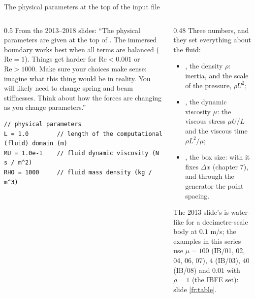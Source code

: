 \documentclass[aspectratio=169,11pt]{beamer}
\begin{document}
\begin{frame}[fragile]{The physical parameters at the top of the input file}
\label{fr:top}
\begin{columns}[T,onlytextwidth]
\begin{column}{0.5\textwidth}
\small From the 2013--2018 slides: ``The physical parameters are given at the top of . The immersed boundary works best when all terms are balanced ($\mathrm{Re} = 1$). Things get harder for $\mathrm{Re} < 0.001$ or $\mathrm{Re} > 1000$. Make sure your choices make sense: imagine what this thing would be in reality. You will likely need to change spring and beam stiffnesses. Think about how the forces are changing as you change parameters.''
\begin{lstlisting}[style=input]
// physical parameters
L = 1.0        // length of the computational (fluid) domain (m)
MU = 1.0e-1    // fluid dynamic viscosity (N s / m^2)
RHO = 1000     // fluid mass density (kg / m^3)
\end{lstlisting}
\end{column}
\begin{column}{0.48\textwidth}
\small Three numbers, and they set everything about the fluid:
\begin{itemize}
  \item {}, the density $\rho$: inertia, and the scale of the pressure, $\rho U^2$;
  \item {}, the dynamic viscosity $\mu$: the viscous stress $\mu U/L$ and the viscous time $\rho L^2/\mu$;
  \item {}, the box size: with  it fixes $\Delta x$ (chapter 7), and through the generator the point spacing.
\end{itemize}
The 2013 slide's  is water-like for a decimetre-scale body at $0.1$ m/s; the examples in this series use $\mu = 100$ (IB/01, 02, 04, 06, 07), $4$ (IB/03), $40$ (IB/08) and $0.01$ with $\rho = 1$ (the IBFE set): slide \ref{fr:table}.
\end{column}
\end{columns}
\end{frame}
\end{document}
